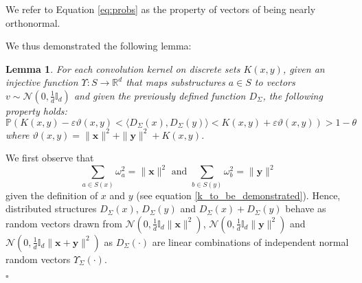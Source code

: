 \documentclass[twoside,11pt]{article}
\newtheorem{lemma}{Lemma}
\newenvironment{proof}{{\bf Proof:}}{$\square$ }
\def\vec#1{\mathbf{#1}}
\def\R{\mathbb{R}}
\def\P{\mathbb{P}}
\def\dotprod#1#2{\langle#1,#2\rangle}
\def\df{\Upsilon}
\def\J{\vartheta}
\begin{document}
We refer to Equation \ref{eq:probs} as the property of vectors of being nearly orthonormal.

We thus demonstrated the following lemma:
\begin{lemma} 
\label{first_formulation}
For each convolution kernel on discrete sets $K(x,y)$, given an injective function $\df: S \rightarrow \R^d$ that maps substructures $a\in S$ to vectors $v \sim \mathcal{N}(0,\frac{1}{d}\mathbb{I}_d)$ and given the previously defined function $D_{\Sigma}$, the following property holds:
$$
\P(K(x,y) - \varepsilon\J(x,y)<\dotprod{D_{\Sigma}(x)}{D_{\Sigma}(y)} < K(x,y)  + \varepsilon \J(x,y)) > 1 - \theta
$$
where 
$\J(x,y) = \|\vec{x}\|^2 + \|\vec{y}\|^2 +  K(x,y)$.
\end{lemma}
\begin{proof}
We first observe that 
$$
\displaystyle\sum_{a\in S(x)} \omega_{a}^2 = \|\vec{x}\|^2 \text{ and }\displaystyle\sum_{b\in S(y)} \omega_{b}^2 = \|\vec{y}\|^2
$$ 
given the definition of $x$ and $y$ (see equation \ref{k_to_be_demonstrated}). 
Hence, distributed structures $D_{\Sigma}(x)$, $D_{\Sigma}(y)$ and $D_{\Sigma}(x)+D_{\Sigma}(y)$ behave as random vectors drawn from $\mathcal{N}(0,\frac{1}{d}\mathbb{I}_d\|\vec{x}\|^2)$, $\mathcal{N}(0,\frac{1}{d}\mathbb{I}_d\|\vec{y}\|^2)$ and $\mathcal{N}(0,\frac{1}{d}\mathbb{I}_d\|\vec{x}+\vec{y}\|^2)$ as $D_{\Sigma}(\cdot)$ are linear combinations of independent normal random vectors $\df_{\Sigma}(\cdot)$.


\end{proof}
\end{document}
